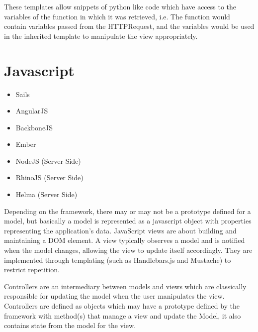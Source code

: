 These templates allow snippets of python like code which have access to the variables of the function in which it was retrieved, i.e.
The function would contain variables passed from the HTTPRequest, and the variables would be used in the inherited template to manipulate
the view appropriately. \newpage

\section{Javascript}

\begin{itemize}
  \item Sails
  \item AngularJS
  \item BackboneJS
  \item Ember
  \item NodeJS (Server Side)
  \item RhinoJS  (Server Side)
  \item Helma (Server Side)
\end{itemize}

\par Depending on the framework, there may or may not be a prototype defined for a model, but basically a model is represented as a javascript object with properties representing the application's data.
JavaScript views are about building and maintaining a DOM element.
A view typically observes a model and is notified when the model changes, allowing the view to update itself accordingly. They are implemented through templating (such as Handlebars.js and Mustache) to restrict repetition.
\par Controllers are an intermediary between models and views which are classically responsible for updating the model when the user manipulates the view.
Controllers are defined as objects which may have a prototype defined by the framework with method(s) that manage a view and update the Model,
it also contains state from the model for the view.
